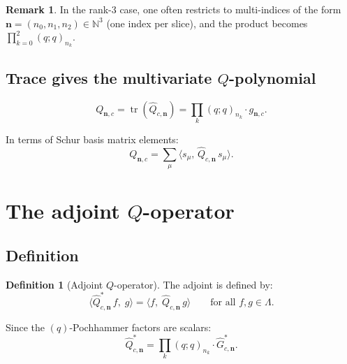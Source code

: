 \documentclass[11pt]{article}
\newcommand{\N}{\mathbb{N}}
\newcommand{\La}{\Lambda}
\newcommand{\qpochn}[3]{(#1;#2)_{#3}}
\DeclareMathOperator{\tr}{tr}
\theoremstyle{plain}
\theoremstyle{definition}
\newtheorem{definition}[theorem]{Definition}
\newtheorem{remark}[theorem]{Remark}
\begin{document}
\begin{remark}
In the rank-3 case, one often restricts to multi-indices of the
form $\mathbf{n} = (n_0, n_1, n_2) \in \N^3$ (one index per slice),
and the product becomes $\prod_{k=0}^{2} \qpochn{q}{q}{n_k}$.
\end{remark}

\subsection{Trace gives the multivariate $Q$-polynomial}

\begin{equation}\label{eq:Q-trace}
  Q_{\mathbf{n},c}
  = \tr(\hat{Q}_{c,\mathbf{n}})
  = \prod_{k} \qpochn{q}{q}{n_k} \cdot g_{\mathbf{n},c}.
\end{equation}

In terms of Schur basis matrix elements:
\begin{equation}\label{eq:Q-schur-sum}
  Q_{\mathbf{n},c}
  = \sum_\mu
    \langle s_\mu,\, \hat{Q}_{c,\mathbf{n}}\, s_\mu \rangle.
\end{equation}


\section{The adjoint $Q$-operator}
\label{sec:Q-adjoint}

\subsection{Definition}

\begin{definition}[Adjoint $Q$-operator]
\label{def:Q-hat-adj}
The adjoint is defined by:
\begin{equation}\label{eq:Q-adj-def}
  \langle \hat{Q}_{c,\mathbf{n}}^*\, f,\; g \rangle
  = \langle f,\; \hat{Q}_{c,\mathbf{n}}\, g \rangle
  \qquad \text{for all } f, g \in \La.
\end{equation}
\end{definition}

Since the $(q)$-Pochhammer factors are scalars:
\begin{equation}\label{eq:Q-adj-decomp}
  \hat{Q}_{c,\mathbf{n}}^*
  = \prod_{k} \qpochn{q}{q}{n_k} \cdot \hat{G}_{c,\mathbf{n}}^*.
\end{equation}
\end{document}
